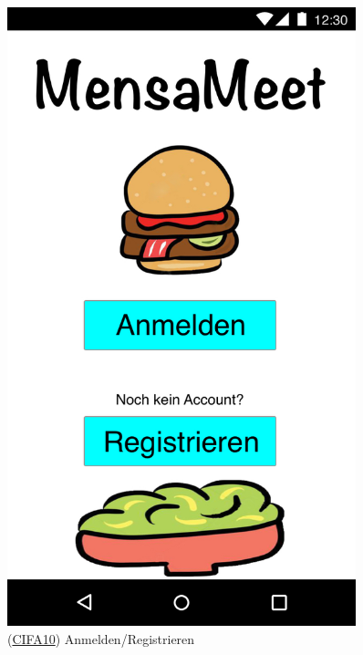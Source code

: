 \documentclass[a4paper]{scrreprt}
\begin{document}
\begin{figure}[H]
	\centering 
	\begin{minipage}[b]{0.48\textwidth} 
		\centering 
		\includegraphics[width=0.9\textwidth]{res/GUI/01.jpeg} 
		\label{Fig.1}
		(\hyperlink{cifa10}{CIFA10}) Anmelden/Registrieren
	\end{minipage}
	\begin{minipage}[b]{0.48\textwidth} 
		\centering 

\end{minipage}
\end{figure}
\end{document}
